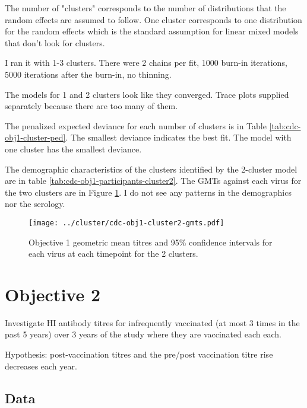 \documentclass[12pt]{article}
\begin{document}
The number of "clusters" corresponds to the number of distributions that the random effects are assumed to follow. One cluster corresponds to one distribution for the random effects which is the standard assumption for linear mixed models that don't look for clusters.

I ran it with 1-3 clusters. There were 2 chains per fit, 1000 burn-in iterations, 5000 iterations after the burn-in, no thinning.

The models for 1 and 2 clusters look like they converged. Trace plots supplied separately because there are too many of them.

The penalized expected deviance for each number of clusters is in Table \ref{tab:cdc-obj1-cluster-ped}. The smallest deviance indicates the best fit. The model with one cluster has the smallest deviance.



The demographic characteristics of the clusters identified by the 2-cluster
model are in table \ref{tab:cdc-obj1-participants-cluster2}. The GMTs against
each virus for the two clusters are in Figure \ref{fig:cdc-obj1-cluster2-gmts}.
I do not see any patterns in the demographics nor the serology.



\begin{figure}
	\texttt{[image: ../cluster/cdc-obj1-cluster2-gmts.pdf]}
	\caption{Objective 1 geometric mean titres and 95\% confidence intervals for each virus at each timepoint for the 2 clusters.}
	\label{fig:cdc-obj1-cluster2-gmts}
\end{figure}

\section{Objective 2}

Investigate HI antibody titres for infrequently vaccinated (at most 3 times in the past 5 years) over 3 years of the study where
they are vaccinated each each.

Hypothesis: post-vaccination titres and the pre/post vaccination titre rise
decreases each year.

\subsection{Data}
\end{document}
